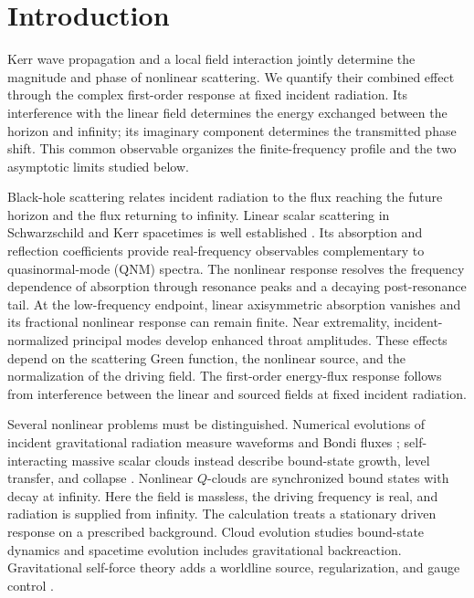 \documentclass[aps,prd,twocolumn,10pt,nofootinbib,superscriptaddress,floatfix]{revtex4-2}
\begin{document}
\maketitle
\section{Introduction}

Kerr wave propagation and a local field interaction jointly determine
the magnitude and phase of nonlinear scattering.  We quantify their
combined effect through the complex first-order response at fixed incident radiation.
Its interference with the linear field determines the energy exchanged
between the horizon and infinity; its imaginary component determines the
transmitted phase shift.  This common observable organizes the finite-frequency
profile and the two asymptotic limits studied below.

Black-hole scattering relates incident radiation to the flux reaching the
future horizon and the flux returning to infinity.  Linear scalar scattering
in Schwarzschild and Kerr spacetimes is well established
\cite{Sanchez1976,Futterman,GlampedakisAndersson2001}.  Its absorption and
reflection coefficients provide real-frequency observables complementary to
quasinormal-mode (QNM) spectra\cite{Berti2009,Kyutoku2023,Rosato2024}.
The nonlinear response resolves the frequency dependence of absorption
through resonance peaks and a decaying post-resonance tail.
At the low-frequency endpoint, linear axisymmetric absorption vanishes
and its fractional nonlinear response can remain finite.  Near extremality,
incident-normalized principal modes develop enhanced throat amplitudes.
These effects depend on the scattering Green function, the nonlinear source,
and the normalization of the driving field.  The first-order energy-flux response follows
from interference between the linear and sourced fields at fixed incident
radiation.

Several nonlinear problems must be distinguished.  Numerical evolutions of
incident gravitational radiation measure waveforms and Bondi fluxes
\cite{Zlochower2003,Frauendiener2021}; self-interacting massive scalar clouds
instead describe bound-state growth, level transfer, and collapse
\cite{YoshinoKodama2012,Baryakhtar2021}.  Nonlinear $Q$-clouds are synchronized
bound states with decay at infinity\cite{HerdeiroQCloud2014}.  Here the field
is massless, the driving frequency is real, and radiation is supplied from
infinity.  The calculation treats a stationary driven response on a prescribed
background.  Cloud evolution studies bound-state dynamics and spacetime
evolution includes gravitational backreaction.  Gravitational self-force
theory adds a worldline source, regularization, and gauge control
\cite{BarackPound2019,PoundWardell2021}.
\end{document}

